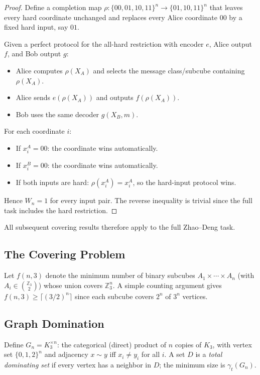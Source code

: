 \documentclass[11pt,letterpaper]{article}
\newcommand{\Z}{\mathbb{Z}}
\newcommand{\gammat}{\gamma_t}
\begin{document}
\begin{proof}
Define a completion map $\rho : \{00,01,10,11\}^n \to \{01,10,11\}^n$ that leaves every hard coordinate unchanged and replaces every Alice coordinate $00$ by a fixed hard input, say $01$.

Given a perfect protocol for the all-hard restriction with encoder $e$, Alice output $f$, and Bob output $g$:
\begin{itemize}[leftmargin=*,itemsep=1pt]
  \item Alice computes $\rho(X_A)$ and selects the message class/subcube containing $\rho(X_A)$.
  \item Alice sends $e(\rho(X_A))$ and outputs $f(\rho(X_A))$.
  \item Bob uses the same decoder $g(X_B, m)$.
\end{itemize}

For each coordinate $i$:
\begin{itemize}[leftmargin=*,itemsep=1pt]
  \item If $x_i^A = 00$: the coordinate wins automatically.
  \item If $x_i^B = 00$: the coordinate wins automatically.
  \item If both inputs are hard: $\rho(x_i^A) = x_i^A$, so the hard-input protocol wins.
\end{itemize}
Hence $W_n = 1$ for every input pair. The reverse inequality is trivial since the full task includes the hard restriction.
\end{proof}

All subsequent covering results therefore apply to the full Zhao--Deng task.

\subsection{The Covering Problem}

Let $f(n,3)$ denote the minimum number of binary subcubes $A_1 \times \cdots \times A_n$ (with $A_i \in \binom{\Z_3}{2}$) whose union covers $\Z_3^n$. A simple counting argument gives $f(n,3) \geq \lceil (3/2)^n \rceil$ since each subcube covers $2^n$ of $3^n$ vertices.

\subsection{Graph Domination}

Define $G_n = K_3^{\times n}$: the categorical (direct) product of $n$ copies of $K_3$, with vertex set $\{0,1,2\}^n$ and adjacency $x \sim y$ iff $x_i \neq y_i$ for all $i$. A set $D$ is a \emph{total dominating set} if every vertex has a neighbor in $D$; the minimum size is $\gammat(G_n)$.
\end{document}
